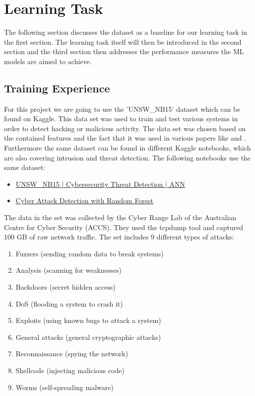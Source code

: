 \section{Learning Task}
The following section discusses the dataset as a baseline for our learning task in the first section. The learning task itself will then be introduced in the second section and the third section then addresses the performance measures the ML models are aimed to achieve.

\subsection{Training Experience}
\label{sec:dataset}
For this project we are going to use the 'UNSW\_NB15' dataset \cite{UNSW} which can be found on Kaggle. This data set was used to train and test various systems in order to detect hacking or malicious activity. 
The data set was chosen based on the contained features and the fact that it was used in various papers like \cite{10.1016/j.jnca.2024.103925} and \cite{10.1016/j.jksuci.2024.102164}. Furthermore the same dataset can be found in different Kaggle notebooks, which are also covering intrusion and threat detection. The following notebooks use the same dataset:

\begin{itemize}
    \item \href{https://www.kaggle.com/code/getanmolgupta01/unsw-nb15-cybersecurity-threat-detection-ann/notebook}{UNSW\_NB15 | Cybersecurity Threat Detection | ANN} \cite{unsw_nb15_ann_notebook}
    \item \href{https://www.kaggle.com/code/akritiupadhyayks/cyber-attack-detection-with-random-forest}{Cyber Attack Detection with Random Forest} \cite{cyber_attack_rf_notebook}
\end{itemize}


\nextparagraph
The data in the set was collected by the Cyber Range Lab of the Australian Centre for Cyber Security (ACCS). They used the tcpdump tool and captured 100 GB of raw network traffic. The set includes 9 different types of attacks:

\begin{enumerate}
    \item Fuzzers (sending random data to break systems)
    \item Analysis (scanning for weaknesses)
    \item Backdoors (secret hidden access)
    \item DoS (flooding a system to crash it)
    \item Exploits (using known bugs to attack a system)
    \item General attacks (general cryptographic attacks)
    \item Reconnaissance (spying the network)
    \item Shellcode (injecting malicious code)
    \item Worms (self-spreading malware)
\end{enumerate}


